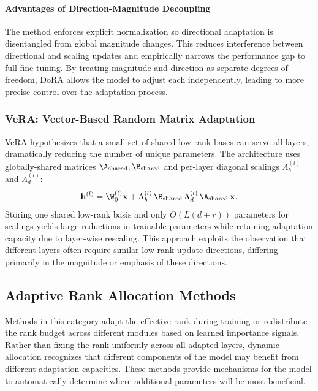 \paragraph{Advantages of Direction-Magnitude Decoupling}
The method enforces explicit normalization so directional adaptation is disentangled from global magnitude changes. This reduces interference between directional and scaling updates and empirically narrows the performance gap to full fine-tuning. By treating magnitude and direction as separate degrees of freedom, DoRA allows the model to adjust each independently, leading to more precise control over the adaptation process.

\subsubsection{VeRA: Vector-Based Random Matrix Adaptation \cite{kopiczko2023vera}}
\label{subsubsec:vera}

VeRA hypothesizes that a small set of shared low-rank bases can serve all layers, dramatically reducing the number of unique parameters. The architecture uses globally-shared matrices $\A_{\text{shared}},\B_{\text{shared}}$ and per-layer diagonal scalings $\Lambda_b^{(l)}$ and $\Lambda_d^{(l)}$:
\begin{equation}
  \mathbf{h}^{(l)} = \W_0^{(l)}\mathbf{x} + \Lambda_b^{(l)}\,\B_{\text{shared}}\,\Lambda_d^{(l)}\,\A_{\text{shared}}\,\mathbf{x}.
\end{equation}
Storing one shared low-rank basis and only $O(L(d + r))$ parameters for scalings yields large reductions in trainable parameters while retaining adaptation capacity due to layer-wise rescaling. This approach exploits the observation that different layers often require similar low-rank update directions, differing primarily in the magnitude or emphasis of these directions.

\subsection{Adaptive Rank Allocation Methods}
\label{subsec:dynamic}

Methods in this category adapt the effective rank during training or redistribute the rank budget across different modules based on learned importance signals. Rather than fixing the rank uniformly across all adapted layers, dynamic allocation recognizes that different components of the model may benefit from different adaptation capacities. These methods provide mechanisms for the model to automatically determine where additional parameters will be most beneficial.

